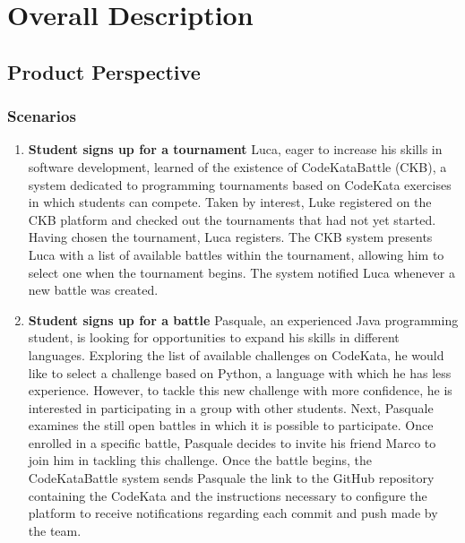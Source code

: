 \section{Overall Description}

\subsection{Product Perspective}

\subsubsection{Scenarios}
\begin{enumerate}
    \item \textbf{Student signs up for a tournament}
    \newline
    Luca, eager to increase his skills in software development, learned of the existence of CodeKataBattle (CKB), a system dedicated to programming tournaments based on CodeKata exercises in which students can compete. Taken by interest, Luke registered on the CKB platform and checked out the tournaments that had not yet started. Having chosen the tournament, Luca registers.  The CKB system presents Luca with a list of available battles within the tournament,  allowing him to select one when the tournament begins. The system notified Luca whenever a new battle was created.


    \item \textbf{Student signs up for a battle}
    \newline
    Pasquale, an experienced Java programming student, is looking for opportunities to expand his skills in different languages. Exploring the list of available challenges on CodeKata, he would like to select a challenge based on Python, a language with which he has less experience. However, to tackle this new challenge with more confidence, he is interested in participating in a group with other students. Next, Pasquale examines the still open battles in which it is possible to participate.
    \newline
    Once enrolled in a specific battle, Pasquale decides to invite his friend Marco to join him in tackling this challenge. Once the battle begins, the CodeKataBattle system sends Pasquale the link to the GitHub repository containing the CodeKata and the instructions necessary to configure the platform to receive notifications regarding each commit and push made by the team.
    
  
    

\end{enumerate}

